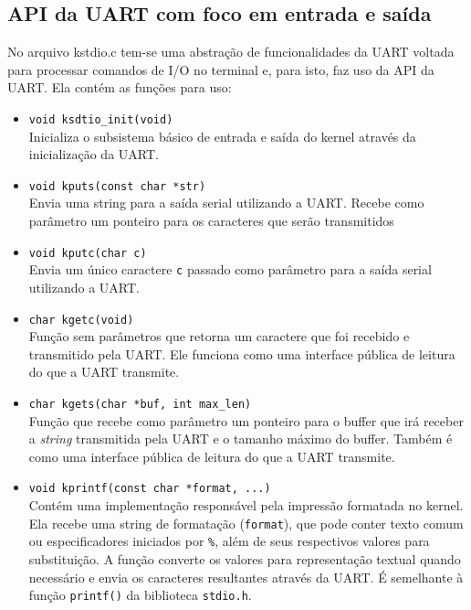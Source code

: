\subsection{API da UART com foco em entrada e saída}
No arquivo kstdio.c tem-se uma abstração de funcionalidades da UART voltada para processar comandos de I/O no terminal e, para isto, faz uso da API da UART. Ela contém as funções para uso:

\begin{itemize}

    \item \texttt{void ksdtio\_init(void)}\\
    Inicializa o subsistema básico de entrada e saída do kernel através da inicialização da UART.

    \item \texttt{void kputs(const char *str)}\\
    Envia uma string para a saída serial utilizando a UART. Recebe como parâmetro um ponteiro para os caracteres que serão transmitidos


    \item \texttt{void kputc(char c)}\\
    Envia um único caractere \texttt{c} passado como parâmetro para a saída serial utilizando a UART.


    \item \texttt{char kgetc(void)}\\
    Função sem parâmetros que retorna um caractere que foi recebido e transmitido pela UART. Ele funciona como uma interface pública de leitura do que a UART transmite. 

    \item \texttt{char kgets(char *buf, int max\_len)}\\
    Função que recebe como parâmetro um ponteiro para o buffer que irá receber a \textit{string} transmitida pela UART e o tamanho máximo do buffer. Também é como uma interface pública de leitura do que a UART transmite. 

    \item \texttt{void kprintf(const char *format, ...)}\\
    Contém uma implementação responsável pela impressão formatada no kernel. Ela recebe uma string de formatação (\texttt{format}), que pode conter texto comum ou especificadores iniciados por \texttt{\%}, além de seus respectivos valores para substituição. A função converte os valores para representação textual quando necessário e envia os caracteres resultantes através da UART. É semelhante à função \texttt{printf()} da biblioteca \texttt{stdio.h}.


\end{itemize}
